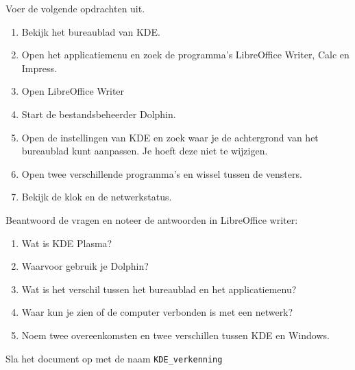 Voer de volgende opdrachten uit.
\begin{enumerate}
\item Bekijk het bureaublad van KDE.
\item Open het applicatiemenu en zoek de programma's LibreOffice Writer, Calc en Impress.
\item Open LibreOffice Writer
\item Start de bestandsbeheerder Dolphin.
\item Open de instellingen van KDE en zoek waar je de achtergrond van het bureaublad kunt aanpassen. Je hoeft deze niet te wijzigen.
\item Open twee verschillende programma's en wissel tussen de vensters.
\item Bekijk de klok en de netwerkstatus.
\end{enumerate}

Beantwoord de vragen en noteer de antwoorden in LibreOffice writer:
\begin{enumerate}
\item Wat is KDE Plasma?
\item Waarvoor gebruik je Dolphin?
\item Wat is het verschil tussen het bureaublad en het applicatiemenu?
\item Waar kun je zien of de computer verbonden is met een netwerk?
\item Noem twee overeenkomsten en twee verschillen tussen KDE en Windows.
\end{enumerate}

Sla het document op met de naam \texttt{KDE\_verkenning}

